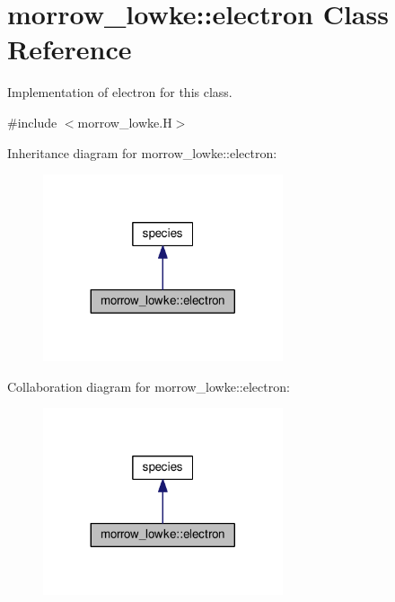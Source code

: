 \hypertarget{classmorrow__lowke_1_1electron}{}\section{morrow\+\_\+lowke\+:\+:electron Class Reference}
\label{classmorrow__lowke_1_1electron}


Implementation of electron for this class.  




{\ttfamily \#include $<$morrow\+\_\+lowke.\+H$>$}



Inheritance diagram for morrow\+\_\+lowke\+:\+:electron\+:\nopagebreak
\begin{figure}[H]
\begin{center}
\leavevmode
\includegraphics[width=200pt]{classmorrow__lowke_1_1electron__inherit__graph}
\end{center}
\end{figure}


Collaboration diagram for morrow\+\_\+lowke\+:\+:electron\+:\nopagebreak
\begin{figure}[H]
\begin{center}
\leavevmode
\includegraphics[width=200pt]{classmorrow__lowke_1_1electron__coll__graph}
\end{center}
\end{figure}
